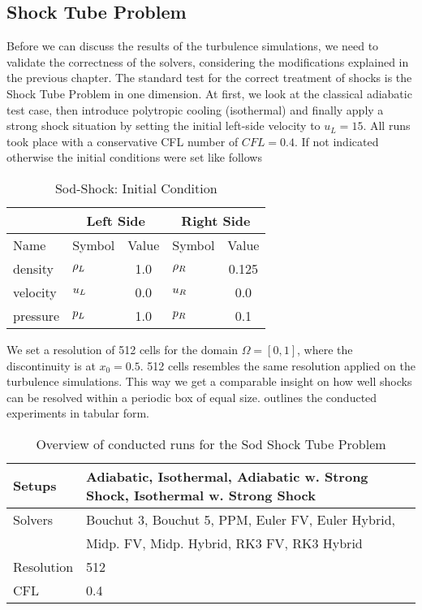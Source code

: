 \subsection{ Shock Tube Problem}
\label{sec:sod-shock-tube}
Before we can discuss the results of the turbulence simulations, we
need to validate the correctness of the solvers, considering the
modifications explained in the previous chapter. The standard test for the
correct treatment of shocks is the  Shock Tube Problem in one
dimension. At first, we look at the classical adiabatic test case, then
introduce polytropic cooling (isothermal) and finally apply a strong shock
situation by setting the initial left-side velocity to $u_L = 15$. All runs took
place with a conservative CFL number of $CFL = 0.4$.
If not indicated otherwise the initial conditions were set like follows
\begin{table}[H]
\caption{Sod-Shock: Initial Condition}
\centering
\begin{tabular}{llc|lc}
\toprule
&
\multicolumn{2}{c}{Left Side} &
\multicolumn{2}{c}{Right Side} \\
\midrule
Name & Symbol & Value & Symbol & Value\\
\midrule
density         & $\rho_{L}$       & 1.0 & $\rho_{R}$ & 0.125 \\ 
velocity        & $u_{L}$       & 0.0 & $u_{R}$ & 0.0 \\ 
pressure        & $p_{L}$       & 1.0 & $p_{R}$ & 0.1 \\  
\bottomrule
\end{tabular}
\label{tab:initial-state-sod-shock}
\end{table}
We set a resolution of 512 cells for the domain $\Omega = [0,1]$, where the
discontinuity is at $x_0 = 0.5$.  512 cells resembles the same resolution
applied on the turbulence simulations. This way we get a comparable insight on
how well shocks can be resolved within a periodic box of equal size.
 outlines the conducted experiments in tabular form.
\begin{table}[H]
\caption{Overview of conducted runs for the Sod Shock Tube Problem}
\centering
\begin{tabular}{l|l}
\toprule
Setups & Adiabatic, Isothermal, Adiabatic w. Strong Shock,
Isothermal w. Strong Shock \\ 
\midrule
Solvers  & Bouchut 3, Bouchut 5, PPM, Euler FV, Euler Hybrid\footnotemark,\\
& Midp. FV, Midp. Hybrid, RK3 FV, RK3 Hybrid \\ 
\midrule
Resolution & 512 \\
\midrule
CFL    &  0.4 \\
\bottomrule
\end{tabular}
\label{tab:sod-runs}
\end{table}

